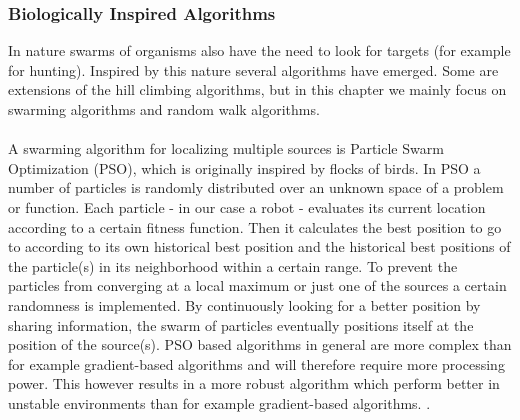 	\subsubsection{Biologically Inspired Algorithms}
		\label{subsubsec:BiologicallyInspired}
		In nature swarms of organisms also have the need to look for targets (for example for hunting). Inspired by this nature several algorithms have emerged. Some are extensions of the hill climbing algorithms, but in this chapter we mainly focus on swarming algorithms and random walk algorithms.\\
		\\
		A swarming algorithm for localizing multiple sources is Particle Swarm Optimization (PSO), which is originally inspired by flocks of birds.
		In PSO a number of particles is randomly distributed over an unknown space of a problem or function. 
		Each particle - in our case a robot - evaluates its current location according to a certain fitness function.
		Then it calculates the best position to go to according to its own historical best position and the historical best positions of the particle(s) in its neighborhood within a certain range.
		To prevent the particles from converging at a local maximum or just one of the sources a certain randomness is implemented. 
		By continuously looking for a better position by sharing information, the swarm of particles eventually positions itself at the position of the source(s). \cite{poli2007particle} 
		PSO based algorithms in general are more complex than for example gradient-based algorithms and will therefore require more processing power.
		This however results in a more robust algorithm which perform better in unstable environments than for example gradient-based algorithms. \cite{marques2006particle}.
